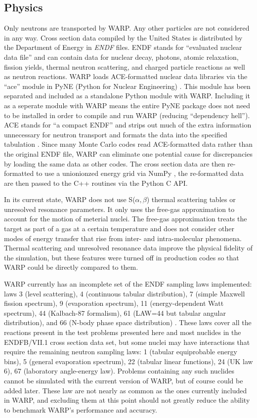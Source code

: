 \documentclass[preprint,12pt]{elsarticle}
\begin{document}
\subsection{Physics}

Only neutrons are transported by WARP.  Any other particles are not considered in any way.  Cross section data compiled by the United States is distributed by the Department of Energy in \emph{ENDF} files.  ENDF stands for ``evaluated nuclear data file'' and can contain data for nuclear decay, photons, atomic relaxation, fission yields, thermal neutron scattering, and charged particle reactions as well as neutron reactions.   WARP loads ACE-formatted nuclear data libraries via the ``ace'' module in PyNE (Python for Nuclear Engineering) \cite{pyne}.  This module has been separated and included as a standalone Python module with WARP.  Including it as a seperate module with WARP means the entire PyNE package does not need to be installed in order to compile and run WARP (reducing ``dependency hell'').  ACE stands for ``a compact ENDF'' and strips out much of the extra information unnecessary for neutron transport and formats the data into the specified tabulation \cite{endfnums}.  Since many Monte Carlo codes read ACE-formatted data rather than the original ENDF file, WARP can eliminate one potential cause for discrepancies by loading the same data as other codes.  The cross section data are then re-formatted to use a unionionzed energy grid via NumPy \cite{numpy}, the re-formatted data are then passed to the C++ routines via the Python C API.

In its current state, WARP does not use S($\alpha,\beta$) thermal scattering tables or unresolved resonance parameters.  It only uses the free-gas approximation to account for the motion of meterial nuclei.  The free-gas approximation treats the target as part of a gas at a certain temperature and does not consider other modes of energy transfer that rise from inter- and intra-molecular phenomena.  Thermal scattering and unresolved resonance data improve the physical fidelity of the simulation, but these features were turned off in production codes so that WARP could be directly compared to them. 

WARP currently has an incomplete set of the ENDF sampling laws implemented: laws 3 (level scattering), 4 (continuous tabular distribution), 7 (simple Maxwell fission spectrum), 9 (evaporation spectrum), 11 (energy-dependent Watt spectrum), 44 (Kalbach-87 formalism), 61 (LAW=44 but tabular angular distribution), and 66 (N-body phase space distribution) \cite{MCNP}.  These laws cover all the reactions present in the test problems presented here and most nuclides in the ENDFB/VII.1 cross section data set, but some nuclei may have interactions that require the remaining neutron sampling laws: 1 (tabular equiprobable energy bins), 5 (general evaporation spectrum), 22 (tabular linear functions), 24 (UK law 6), 67 (laboratory angle-energy law).  Problems containing any such nuclides cannot be simulated with the current version of WARP, but of course could be added later.  These law are not nearly as common as the ones currently included in WARP, and excluding them at this point should not greatly reduce the ability to benchmark WARP's performance and accuracy.
\end{document}
